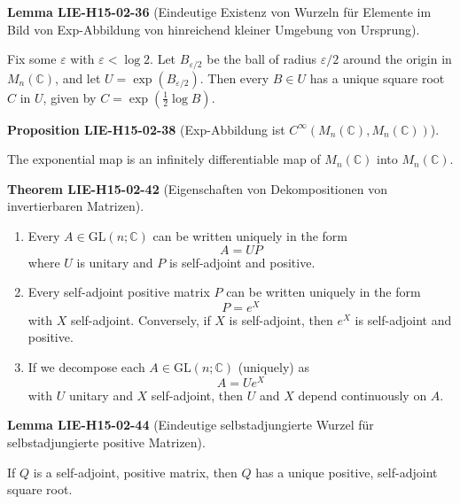 \documentclass[10pt, letterpaper]{article}
\newcommand{\C}{\mathbb{C}}
\newcommand{\CustomHeading}[3]{%
  \par\medskip\noindent%
  \textbf{#1 #2} \textnormal{(#3)}.\enskip%
}
\newenvironment{PROP}[2]{\CustomHeading{Proposition}{#1}{#2}}{}
\newenvironment{THEO}[2]{\CustomHeading{Theorem}{#1}{#2}}{}
\newenvironment{LEM}[2]{\CustomHeading{Lemma}{#1}{#2}}{}
\begin{document}
\begin{LEM}{LIE-H15-02-36}{Eindeutige Existenz von Wurzeln für Elemente im Bild von Exp-Abbildung von hinreichend kleiner Umgebung von Ursprung}
Fix some $\varepsilon$ with $\varepsilon<\log 2$. Let $B_{\varepsilon / 2}$ be the ball of radius $\varepsilon / 2$ around the origin in $M_{n}(\mathbb{C})$, and let $U=\exp \left(B_{\varepsilon / 2}\right)$. Then every $B \in U$ has a unique square root $C$ in $U$, given by $C=\exp \left(\frac{1}{2} \log B\right)$.
\end{LEM}

\begin{PROP}{LIE-H15-02-38}{Exp-Abbildung ist $C^\infty(M_n(\C),M_n(\C))$}
The exponential map is an infinitely differentiable map of $M_{n}(\mathbb{C})$ into $M_{n}(\mathbb{C})$.
\end{PROP}

\begin{THEO}{LIE-H15-02-42}{Eigenschaften von Dekompositionen von invertierbaren Matrizen}
\begin{enumerate}
  \item Every $A \in \mathrm{GL}(n ; \mathbb{C})$ can be written uniquely in the form
    $$
    A=U P
    $$
    where $U$ is unitary and $P$ is self-adjoint and positive.
    
    \item Every self-adjoint positive matrix $P$ can be written uniquely in the form
    $$
    P=e^{X}
    $$
    with $X$ self-adjoint. Conversely, if $X$ is self-adjoint, then $e^{X}$ is self-adjoint and positive.

    \item If we decompose each $A \in \mathrm{GL}(n ; \mathbb{C})$ (uniquely) as
    $$
    A=U e^{X}
    $$
    with $U$ unitary and $X$ self-adjoint, then $U$ and $X$ depend continuously on $A$.
\end{enumerate}
\end{THEO}

\begin{LEM}{LIE-H15-02-44}{Eindeutige selbstadjungierte Wurzel für selbstadjungierte positive Matrizen}
If $Q$ is a self-adjoint, positive matrix, then $Q$ has a unique positive, self-adjoint square root.
\end{LEM}
\end{document}

